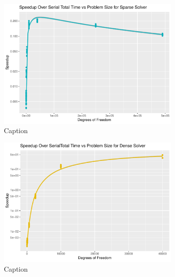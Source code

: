 \begin{figure}
	\centering
	\begin{subfigure}{0.48\linewidth}
		\centering
		\includegraphics[width = \linewidth]{Plots/total_sparse_cpu_speedup_vs_n}
		\caption{Caption}
		\label{fig:tot_sparse}
	\end{subfigure}\hfill
	\begin{subfigure}{0.48\linewidth}
		\centering
		\includegraphics[width=\linewidth]{Plots/total_dense_cpu_speedup_vs_n}
		\caption{Caption}
		\label{fig:tot_dense}
	\end{subfigure}\\
	\begin{subfigure}{0.48\linewidth}
		\centering

\end{subfigure}
\end{figure}

